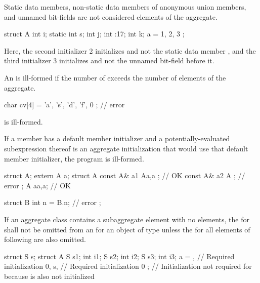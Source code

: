 \pnum
\begin{note}
Static data members,
non-static data members of anonymous union members,
and
unnamed bit-fields
are not considered elements of the aggregate.
\begin{example}
\begin{codeblock}
struct A {
  int i;
  static int s;
  int j;
  int :17;
  int k;
} a = { 1, 2, 3 };
\end{codeblock}

Here, the second initializer 2 initializes
and not the static data member
, and the third initializer 3 initializes 
and not the unnamed bit-field before it.
\end{example}
\end{note}

\pnum
An
is ill-formed if the number of
exceeds the number of elements of the aggregate.
\begin{example}
\begin{codeblock}
char cv[4] = { 'a', 's', 'd', 'f', 0 };     // error
\end{codeblock}
is ill-formed.
\end{example}

\pnum
If a member has a default member initializer
and a potentially-evaluated subexpression thereof is an aggregate
initialization that would use that default member initializer,
the program is ill-formed.
\begin{example}
\begin{codeblock}
struct A;
extern A a;
struct A {
  const A& a1 { A{a,a} };       // OK
  const A& a2 { A{} };          // error
};
A a{a,a};                       // OK

struct B {
  int n = B{}.n;                // error
};
\end{codeblock}
\end{example}

\pnum
If an aggregate class  contains a subaggregate element
 with no elements,
the  for  shall not be
omitted from an  for an object of type
 unless the  for all
elements of  following  are also omitted.
\begin{example}
\begin{codeblock}
struct S { } s;
struct A {
  S s1;
  int i1;
  S s2;
  int i2;
  S s3;
  int i3;
} a = {
  { },              // Required initialization
  0,
  s,                // Required initialization
  0
};                  // Initialization not required for  because  is also not initialized
\end{codeblock}
\end{example}

